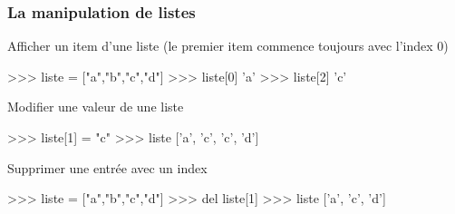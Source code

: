 \begin{frame}[fragile]
\frametitle{La manipulation de listes}

\begin{minipage}[t]{0.38\linewidth}
Afficher un item d'une liste (le premier item commence toujours avec l'index 0)
\end{minipage}\hfill
\begin{minipage}[t]{0.58\linewidth}
\vspace{-0.5cm}
\begin{GrayBox}[0.85\textwidth]
\begin{verbatimtab}[3]
>>> liste = ["a","b","c","d"]
>>> liste[0]
'a'
>>> liste[2]
'c'
\end{verbatimtab}
\end{GrayBox}
\end{minipage}

\begin{minipage}[t]{0.38\linewidth}
Modifier une valeur de une liste
\end{minipage}\hfill
\begin{minipage}[t]{0.58\linewidth}
\vspace{-0.5cm}
\begin{GrayBox}[0.85\textwidth]
\begin{verbatimtab}[3]
>>> liste[1] = "c"
>>> liste
['a', 'c', 'c', 'd']
\end{verbatimtab}
\end{GrayBox}
\end{minipage}

\begin{minipage}[t]{0.38\linewidth}
Supprimer une entrée avec un index
\end{minipage}\hfill
\begin{minipage}[t]{0.58\linewidth}
\vspace{-0.5cm}
\begin{GrayBox}[0.85\textwidth]
\begin{verbatimtab}[3]
>>> liste = ["a","b","c","d"]
>>> del liste[1]
>>> liste
['a', 'c', 'd']
\end{verbatimtab}
\end{GrayBox}
\end{minipage}
\end{frame}

